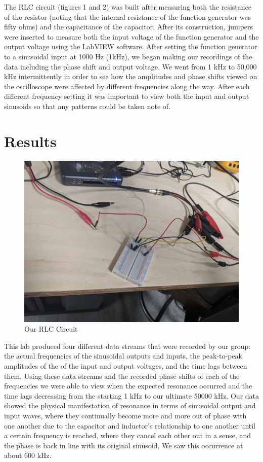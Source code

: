 \documentclass[10pt,twocolumn]{article}
\begin{document}
The RLC circuit (figures 1 and 2) was built after measuring both the resistance of the resistor (noting that the internal resistance of the function generator was fifty ohms) and the capacitance of the capacitor. After its construction, jumpers were inserted to measure both the input voltage of the function generator and the output voltage using the LabVIEW software. After setting the function generator to a sinusoidal input at 1000 Hz (1kHz), we began making our recordings of the data including the phase shift and output voltage. We went from 1 kHz to 50,000 kHz intermittently in order to see how the amplitudes and phase shifts viewed on the oscilloscope were affected by different frequencies along the way. After each different frequency setting it was important to view both the input and output sinusoids so that any patterns could be taken note of.  


\section{Results}
\label{sec:results}

\begin{figure}[bt]
	\centering
	\includegraphics[width=.9\linewidth]{figures/RLCcircuit.PNG}
	\caption{Our RLC Circuit}
	\label{fig:diagram2}
\end{figure}
This lab produced four different data streams that were recorded by our group: the actual frequencies of the sinusoidal outputs and inputs, the peak-to-peak amplitudes of the of the input and output voltages, and the time lags between them. Using these data streams and the recorded phase shifts of each of the frequencies we were able to view when the expected resonance occurred and the time lags decreasing from the starting 1 kHz to our ultimate 50000 kHz. Our data showed the physical manifestation of resonance in terms of sinusoidal output and input waves, where they continually become more and more out of phase with one another due to the capacitor and inductor’s relationship to one another until a certain frequency is reached, where they cancel each other out in a sense, and the phase is back in line with its original sinusoid. We saw this occurrence at about 600 kHz. 
\end{document}
